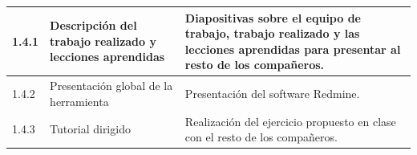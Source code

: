 \documentclass[a4paper,10pt]{scrartcl}
\begin{document}
\begin{table}[H]
{\begin{tabular}{|l|l|l|}
		1.4.1  & Descripción del trabajo realizado y lecciones aprendidas & Diapositivas sobre el equipo de trabajo, trabajo realizado y las lecciones aprendidas para presentar al resto de los compañeros. \\ \hline
		1.4.2  & Presentación global de la herramienta & Presentación del software Redmine. \\ \hline
		1.4.3  & Tutorial dirigido & Realización del ejercicio propuesto en clase con el resto de los compañeros. \\ \hline
	\end{tabular}
}
\end{table}


\end{document}

